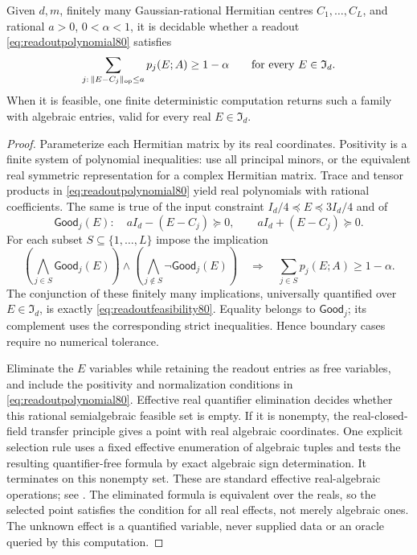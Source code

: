 \begin{lemma}
\label{lem:algebraicreadout80}
Given $d,m$, finitely many Gaussian-rational Hermitian centres
$C_1,\ldots,C_L$, and rational $a>0$, $0<\alpha<1$, it is
decidable whether a readout \eqref{eq:readoutpolynomial80} satisfies
\begin{equation}\label{eq:readoutfeasibility80}
 \sum_{j:\,\|E-C_j\|_{\rm op}\le a}p_j(E;A)\ge1-\alpha
 \qquad\hbox{for every }E\in\mathfrak I_d.
\end{equation}
When it is feasible, one finite deterministic computation returns
such a family with algebraic entries, valid for every real
$E\in\mathfrak I_d$.
\end{lemma}
\begin{proof}
Parameterize each Hermitian matrix by its real coordinates.
Positivity is a finite system of polynomial inequalities: use all
principal minors, or the equivalent real symmetric representation
for a complex Hermitian matrix.  Trace and tensor products in
\eqref{eq:readoutpolynomial80} yield real polynomials with rational
coefficients.  The same is true of the input constraint
$I_d/4\preceq E\preceq3I_d/4$ and of
\[
 \mathsf{Good}_j(E):\quad
 aI_d-(E-C_j)\succeq0,\qquad
 aI_d+(E-C_j)\succeq0.
\]
For each subset $S\subseteq\{1,\ldots,L\}$ impose the implication
\[
 \left(\bigwedge_{j\in S}\mathsf{Good}_j(E)\right)
 \wedge\left(\bigwedge_{j\notin S}\neg\mathsf{Good}_j(E)\right)
 \quad\Longrightarrow\quad
 \sum_{j\in S}p_j(E;A)\ge1-\alpha.
\]
The conjunction of these finitely many implications, universally
quantified over $E\in\mathfrak I_d$, is exactly
\eqref{eq:readoutfeasibility80}.  Equality belongs to
$\mathsf{Good}_j$; its complement uses the corresponding strict
inequalities.  Hence boundary cases require no numerical tolerance.

Eliminate the $E$ variables while retaining the readout entries as
free variables, and include the positivity and normalization
conditions in \eqref{eq:readoutpolynomial80}.  Effective real
quantifier elimination decides whether this rational semialgebraic
feasible set is empty.  If it is nonempty, the real-closed-field
transfer principle gives a point with real algebraic coordinates.
One explicit selection rule uses a fixed effective enumeration of
algebraic tuples and tests the resulting quantifier-free formula
by exact algebraic sign determination.  It terminates on this
nonempty set.
These are standard effective real-algebraic operations; see
\cite[Theorems~2.77, 2.80 and Chapter~14]{BPR80}.
The eliminated formula is equivalent over the reals, so the selected
point satisfies the condition for all real effects, not merely
algebraic ones.  The unknown effect is a quantified variable, never
supplied data or an oracle queried by this computation.
\end{proof}


